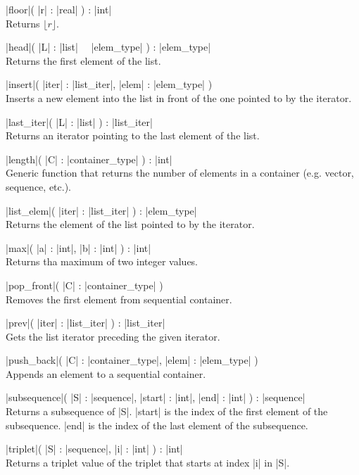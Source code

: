 \documentclass{article}
\newcommand{\OF}{\ \keyword{of}\ }
\begin{document}
\FUNCT |floor|( |r| : |real| ) : |int| \ENDFUNCT \\
Returns $\lfloor r \rfloor$.

\FUNCT |head|( |L| : |list| \OF |elem_type| ) : |elem_type| \ENDFUNCT \\
Returns the first element of the list.

\PROC |insert|( |iter| : |list_iter|, |elem| : |elem_type| ) \ENDPROC \\
Inserts a new element into the list in front of the one pointed to by the iterator.

\FUNCT |last_iter|( |L| : |list| ) : |list_iter| \ENDFUNCT \\
Returns an iterator pointing to the last element of the list.

\FUNCT |length|( |C| : |container_type| ) : |int| \ENDFUNCT\\
Generic function that returns the number of elements in a container
(e.g. vector, sequence, etc.).

\FUNCT |list_elem|( |iter| : |list_iter| ) : |elem_type| \ENDFUNCT \\
Returns the element of the list pointed to by the iterator.

\FUNCT |max|( |a| : |int|, |b| : |int| ) : |int| \ENDFUNCT \\
Returns tha maximum of two integer values.

\PROC |pop_front|( |C| : |container_type| ) \ENDPROC \\
Removes the first element from sequential container.

\FUNCT |prev|( |iter| : |list_iter| ) : |list_iter| \ENDFUNCT \\
Gets the list iterator preceding the given iterator.

\PROC |push_back|( |C| : |container_type|, |elem| : |elem_type| ) \ENDPROC \\
Appends an element to a sequential container.

\FUNCT |subsequence|( |S| : |sequence|, |start| : |int|, |end| : |int| ) : |sequence| \ENDFUNCT\\
Returns a subsequence of |S|. |start| is the index of the first element of
the subsequence. |end| is the index of the last element of the subsequence.

\FUNCT |triplet|( |S| : |sequence|, |i| : |int| ) : |int|\ENDFUNCT\\
Returns a triplet value of the triplet that starts at index |i| in |S|.
\end{document}
